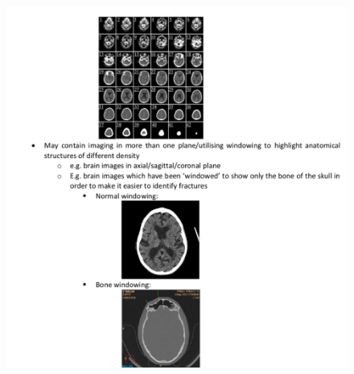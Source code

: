 \documentclass[12pt,twoside]{article}
\begin{document}
\begin{appendices}
\begin{figure}[ht]
\centering
\includegraphics[width = 0.95\hsize]{./figures/ImagingSpec2}
\end{figure}
\clearpage


\end{appendices}
\end{document}

